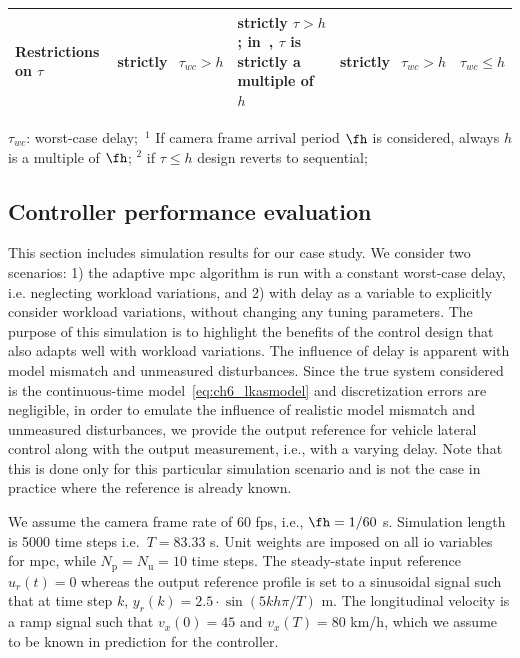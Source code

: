 \begin{table}[t]
{\begin{threeparttable}
\begin{tabular}{|p{2.9cm}|p{3cm}|p{3cm}|p{3cm}|p{3cm}|}
\\ \hline
Restrictions on $\tau$  & strictly\tnote{2}\ $\ \tau_{wc}>h$    & strictly $\tau > h$; in~\cite{medina2019designing}, $\tau$ is strictly a multiple of $h$ & strictly\tnote{2}\ $\ \tau_{wc}>h$  & $\tau_{wc} \le h$   \\ \hline
\end{tabular}%
\begin{tablenotes}
			\footnotesize
			\item{$\tau_{wc}$: worst-case delay;\ $^1$ If camera frame arrival period $\fh$ is considered, always $h$ is a multiple of $\fh$; $^2$ if $\tau\le h$ design reverts to sequential; } 
		\end{tablenotes}
		\end{threeparttable}
}
\vspace{-2em}
\end{table}

\subsection{Controller performance evaluation}
This section includes simulation results for our case study. We consider two scenarios: 1) the adaptive \gls{mpc} algorithm is run with 
a constant worst-case delay, i.e. neglecting workload variations, and 2) with delay as a variable to explicitly consider workload variations, without changing any tuning parameters.
The purpose of this simulation is to highlight the benefits of the control design that also adapts well with workload variations. The influence of delay is apparent with model mismatch and unmeasured disturbances. Since the true system considered is the continuous-time model~\eqref{eq:ch6_lkasmodel} and discretization errors are negligible, in order to emulate the influence of realistic model mismatch and unmeasured disturbances, we provide the output reference for vehicle lateral control along with the output measurement, i.e., with a varying delay. Note that this is done only for this particular simulation scenario and is not the case in practice where the reference is already known.

We assume the camera frame rate of 60 fps, i.e., $\fh=1/60$ s. Simulation length is 5000 time steps i.e.\ $T=83.33$ s. Unit weights are imposed on all \gls{io} variables for \gls{mpc}, while $N_{\text{p}}=N_{\text{u}} = 10$ time steps. The steady-state input reference $u_r(t)=0$ whereas the output reference profile is set to a sinusoidal signal such that at time step $k$, $y_r(k)=2.5\cdot \sin{(5kh\pi/T)} $ m. The longitudinal velocity is a ramp signal such that $v_x(0)=45$ and $v_x(T) = 80$ km/h, which we assume to be known in prediction for the controller. 


